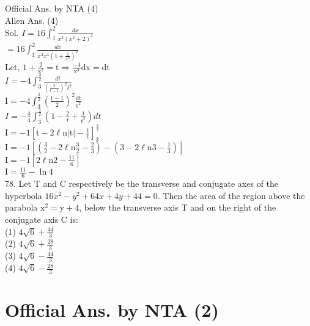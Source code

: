 \documentclass[10pt]{article}
\begin{document}
Official Ans. by NTA (4)\\
Allen Ans. (4)\\
Sol. \(I=16 \int_{1}^{2} \frac{d x}{x^{3}\left(x^{2}+2\right)^{2}}\)\\
\(=16 \int_{1}^{2} \frac{d x}{x^{3} x^{4}\left(1+\frac{2}{x^{2}}\right)^{2}}\)\\
Let, \(1+\frac{2}{\mathrm{x}^{2}}=\mathrm{t} \Rightarrow \frac{-4}{\mathrm{x}^{3}} \mathrm{dx}=\mathrm{dt}\)\\
\(I=-4 \int_{3}^{\frac{3}{2}} \frac{d t}{\left(\frac{2}{t-1}\right)^{2} t^{2}}\)\\
\(\mathrm{I}=-4 \int_{3}^{\frac{3}{2}}\left(\frac{\mathrm{t}-1}{2}\right)^{2} \frac{\mathrm{dt}}{\mathrm{t}^{2}}\)\\
\(I=-\frac{4}{4} \int_{3}^{\frac{3}{2}}\left(1-\frac{2}{t}+\frac{1}{t^{2}}\right) d t\)\\
\(\mathrm{I}=-1\left[\mathrm{t}-2 \ell \mathrm{n}|\mathrm{t}|-\frac{1}{\mathrm{t}}\right]_{3}^{\frac{3}{2}}\)\\
\(\mathrm{I}=-1\left[\left(\frac{3}{2}-2 \ell \mathrm{n} \frac{3}{2}-\frac{2}{3}\right)-\left(3-2 \ell \mathrm{n} 3-\frac{1}{3}\right)\right]\)\\
\(\mathrm{I}=-1\left[2 \ell \mathrm{n} 2-\frac{11}{6}\right]\)\\
\(\mathrm{I}=\frac{11}{6}-\ln 4\)\\
78. Let T and C respectively be the transverse and conjugate axes of the hyperbola \(16 x^{2}- y^{2}+64 x+4 y+44=0\). Then the area of the region above the parabola \(\mathrm{x}^{2}=\mathrm{y}+4\), below the transverse axis T and on the right of the conjugate axis C is:\\
(1) \(4 \sqrt{6}+\frac{44}{3}\)\\
(2) \(4 \sqrt{6}+\frac{28}{3}\)\\
(3) \(4 \sqrt{6}-\frac{44}{3}\)\\
(4) \(4 \sqrt{6}-\frac{28}{3}\)

\section*{Official Ans. by NTA (2)}
\end{document}
